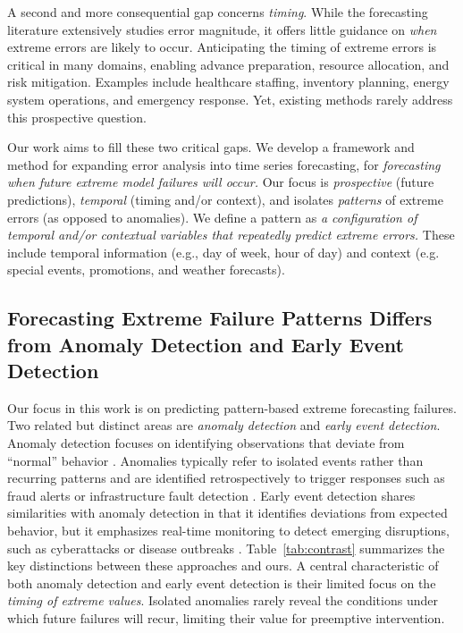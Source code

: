 \documentclass[]{interact}
\theoremstyle{definition}
\begin{document}
A second and more consequential gap concerns \emph{timing}. While the forecasting literature extensively studies error magnitude, it offers little guidance on \emph{when} extreme errors are likely to occur. Anticipating the timing of extreme errors is critical in many domains, enabling advance preparation, resource allocation, and risk mitigation. Examples include healthcare staffing, inventory planning, energy system operations, and emergency response. Yet, existing methods rarely address this prospective question.

Our work aims to fill these two critical gaps. We develop a framework and method for expanding error analysis into time series forecasting, for \textit{forecasting} \textit{when future extreme model failures will occur.} Our focus is \textit{prospective} (future predictions), \textit{temporal} (timing and/or context), and isolates \textit{patterns} of extreme errors (as opposed to anomalies). We define a pattern as \textit{a configuration of temporal and/or contextual} \textit{variables that repeatedly predict extreme errors.} These include temporal information (e.g., day of week, hour of day) and context (e.g. special events, promotions, and weather forecasts).

\renewcommand{\arraystretch}{1.3}

\subsection{Forecasting Extreme Failure Patterns Differs from Anomaly Detection and Early Event Detection}
\label{sec-contrasting}
Our focus in this work is on predicting pattern-based extreme forecasting failures.
Two related but distinct areas are \emph{anomaly detection} and \emph{early event detection}. Anomaly detection focuses on identifying observations that deviate from ``normal'' behavior \citep{chandola2009, nassif2021}. Anomalies typically refer to isolated events rather than recurring patterns and are identified retrospectively to trigger responses such as fraud alerts or infrastructure fault detection \citep{patcha2007, akouemo2016}.
Early event detection shares similarities with anomaly detection in that it identifies deviations from expected behavior, but it emphasizes real-time monitoring to detect emerging disruptions, such as cyberattacks or disease outbreaks \citep{wang2021, deljac2015, shmueli2010}. Table~\ref{tab:contrast} summarizes the key distinctions between these approaches and ours. A central characteristic %
of both anomaly detection and early event detection is their limited focus on the \emph{timing of extreme %
values}. Isolated anomalies rarely reveal the conditions under which future failures will recur, limiting their value for preemptive intervention.
\end{document}
